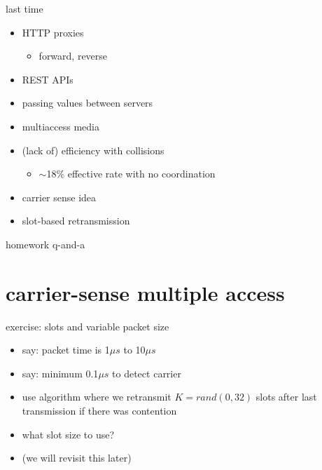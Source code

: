 \date{}
\title{}
\date{}
\usepackage{pgfplots}
\pgfplotsset{compat=1.14}

\begin{frame}
    \titlepage
\end{frame}

\begin{frame}{last time}
    \begin{itemize}
    \item HTTP proxies
        \begin{itemize}
        \item forward, reverse
        \end{itemize}
    \item REST APIs
    \item passing values between servers
    \item multiaccess media
    \item (lack of) efficiency with collisions
        \begin{itemize}
        \item $\sim$18\% effective rate with no coordination
        \end{itemize}
    \item carrier sense idea
    \item slot-based retransmission
    \end{itemize}
\end{frame}



\begin{frame}{homework q-and-a}
\end{frame}

\section{carrier-sense multiple access}


\begin{frame}[label=slotEx]{exercise: slots and variable packet size}
    \begin{itemize}
    \item say: packet time is 1$\mu s$ to 10$\mu s$
    \item say: minimum 0.1$\mu s$ to detect carrier
    \item use algorithm where we retransmit $K=rand(0, 32)$ slots after last transmission if there was contention
    \item what slot size to use?
    \vspace{.5cm}
    \item (we will revisit this later)
    \end{itemize}
\end{frame}



